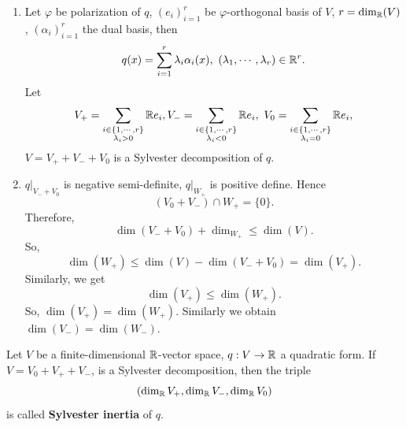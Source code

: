 \begin{proofenv}
    \quad 
    \begin{enumerate}
        \item Let $\varphi$ be polarization of $q$, $\left(e_i\right)_{i=1}^r $ be $\varphi$-orthogonal basis of $V$, $r = \dim_{\mathbb{R}}(V)$, $\left(\alpha_i\right)_{i=1}^r$ the dual basis, then 
            $$ q(x) = \sum_{i=1}^{r} \lambda_{i} \alpha_i(x) ,\ \left(\lambda_1,\cdots , \lambda_r\right) \in \mathbb{R}^r.$$
            Let
            $$ V_+ = \sum_{\substack{i\in \{1,\cdots,r\}\\ \lambda_i>0}} \mathbb{R} e_i, V_- = \sum_{\substack{i\in \{1,\cdots,r\}\\ \lambda_i<0}} \mathbb{R} e_i,\ V_0 = \sum_{\substack{i\in \{1,\cdots,r\}\\ \lambda_i=0}} \mathbb{R} e_i,$$
            $V = V_+ + V_- +V_0$ is a Sylvester decomposition of $q$.
        \item $q|_{V_- + V_0}$ is negative semi-definite, $q|_{W_+}$ is positive define. 
            Hence 
            $$ \left(V_0 + V_-\right)\cap W_+ = \{0\}.$$
            Therefore,
            $$ \dim\left(V_- + V_0\right) + \dim_{W_+} \le \dim(V).$$
            So,
            $$ \dim(W_+) \le \dim(V) - \dim(V_- + V_0) = \dim(V_+).$$
            Similarly, we get
            $$ \dim(V_+) \le \dim(W_+).$$
            So, $\dim(V_+)= \dim(W_+)$. Similarly we obtain $\dim(V_-) = \dim(W_-)$.
    \end{enumerate}
    
\end{proofenv}
\begin{definitionenv}
    Let $V$ be a finite-dimensional $\mathbb{R}$-vector space, $q:V\rightarrow \mathbb{R}$ a quadratic form.
    If $V = V_0 + V_+ +V_-$, is a Sylvester decomposition, then the triple
    $$ \left(\dim_{\mathbb{R}} V_+, \dim_{\mathbb{R}} V_-, \dim_{\mathbb{R}} V_0\right)$$
    is called \textbf{Sylvester inertia} of $q$.
\end{definitionenv}
